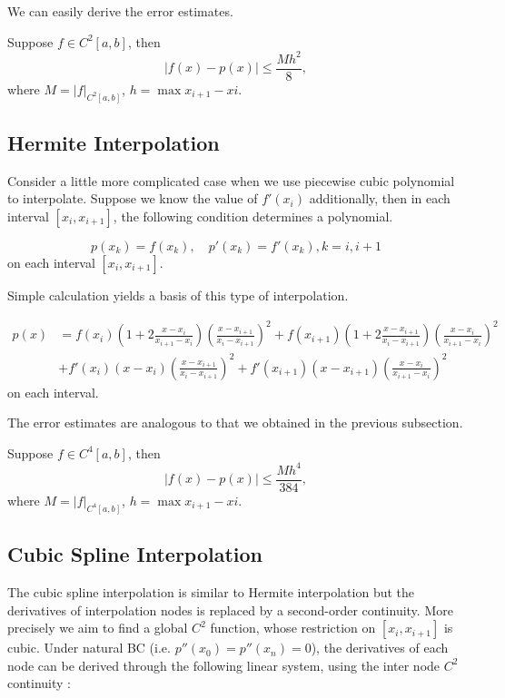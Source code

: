 \documentclass{article}
\begin{document}
We can easily derive the error estimates. 
\begin{proposition}
	Suppose $f \in C^2[a,b]$, then 
	$$|f(x) - p(x)| \le \frac{Mh^2}{8},$$
	where $M = |f|_{C^2[a,b]}$, $h = \max {x_{i+1} - x{i}}$.
\end{proposition}

\subsection{Hermite Interpolation}
Consider a little more complicated case when we use piecewise cubic polynomial to interpolate. Suppose we know the value of $f'(x_i)$ additionally, then in each interval $[x_i, x_{i+1}]$, the following condition determines a polynomial.

$$p(x_k) = f(x_k),\quad p'(x_k) = f'(x_k), k = i,i+1$$
on each interval $[x_i, x_{i+1}]$.

Simple calculation yields a basis of this type of interpolation. 

\begin{equation}
\begin{split}
p(x) &= f(x_i)(1+2\frac{x-x_i}{x_{i+1} - x_i})(\frac{x-x_{i+1}}{x_i - x_{i+1}})^2 + f(x_{i+1})(1+2\frac{x-x_{i+1}}{x_i - x_{i+1}})(\frac{x-x_i}{x_{i+1} - x_i})^2\\
&+f'(x_{i})(x-x_i)(\frac{x-x_{i+1}}{x_i - x_{i+1}})^2 + f'(x_{i+1})(x-x_{i+1})(\frac{x-x_i}{x_{i+1} - x_i})^2
\end{split}
\end{equation}
on each interval. 

The error estimates are analogous to that we obtained in the previous subsection.

\begin{proposition}
	Suppose $f \in C^4[a,b]$, then 
	$$|f(x) - p(x)| \le \frac{Mh^4}{384},$$
	where $M = |f|_{C^4[a,b]}$, $h = \max {x_{i+1} - x{i}}$.
\end{proposition}

\subsection{Cubic Spline Interpolation}
The cubic spline interpolation is similar to Hermite interpolation but the derivatives of interpolation nodes is replaced by a second-order continuity. More precisely we aim to find a global $C^2$ function, whose restriction on $[x_i, x_{i+1}]$ is cubic. Under natural BC (i.e. $p''(x_0) = p''(x_n) = 0$), the derivatives of each node can be derived through the following linear system, using the inter node $C^2$ continuity :
\end{document}
